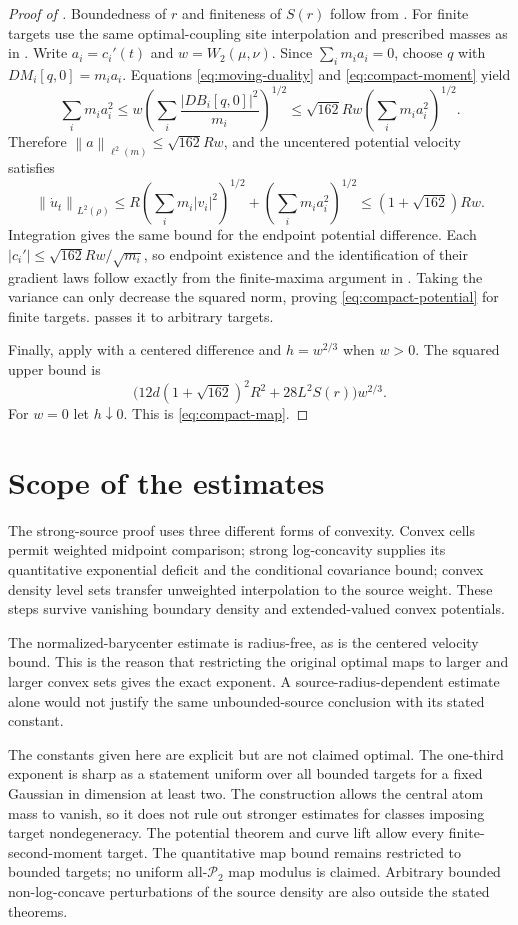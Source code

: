\documentclass[11pt]{article}
\numberwithin{equation}{section}
\theoremstyle{remark}
\newcommand{\Prob}{\mathcal P}
\newcommand{\norm}[1]{\left\lVert #1\right\rVert}
\begin{document}
\begin{proof}[Proof of ]
Boundedness of $r$ and finiteness of $S(r)$ follow from . For finite targets use the same optimal-coupling site interpolation and prescribed masses as in . Write $a_i=c_i'(t)$ and $w=W_2(\mu,\nu)$. Since $\sum_i m_i a_i=0$, choose $q$ with $DM_i[q,0]=m_i a_i$. Equations \eqref{eq:moving-duality} and \eqref{eq:compact-moment} yield
\[
 \sum_i m_i a_i^2
 \le w\left(\sum_i\frac{|DB_i[q,0]|^2}{m_i}\right)^{1/2}
 \le\sqrt{162}Rw\left(\sum_i m_i a_i^2\right)^{1/2}.
\]
Therefore $\norm a_{\ell^2(m)}\le\sqrt{162}Rw$, and the uncentered potential velocity satisfies
\[
 \norm{\dot u_t}_{L^2(\rho)}
 \le R\left(\sum_i m_i|v_i|^2\right)^{1/2}
      +\left(\sum_i m_i a_i^2\right)^{1/2}
 \le(1+\sqrt{162})Rw.
\]
Integration gives the same bound for the endpoint potential difference. Each $|c_i'|\le\sqrt{162}Rw/\sqrt{m_i}$, so endpoint existence and the identification of their gradient laws follow exactly from the finite-maxima argument in . Taking the variance can only decrease the squared norm, proving \eqref{eq:compact-potential} for finite targets.  passes it to arbitrary targets.

Finally, apply  with a centered difference and $h=w^{2/3}$ when $w>0$. The squared upper bound is
\[
 \bigl(12d(1+\sqrt{162})^2R^2+28L^2S(r)\bigr)w^{2/3}.
\]
For $w=0$ let $h\downarrow0$. This is \eqref{eq:compact-map}.
\end{proof}

\section{Scope of the estimates}\label{sec:scope}
The strong-source proof uses three different forms of convexity. Convex cells permit weighted midpoint comparison; strong log-concavity supplies its quantitative exponential deficit and the conditional covariance bound; convex density level sets transfer unweighted interpolation to the source weight. These steps survive vanishing boundary density and extended-valued convex potentials.

The normalized-barycenter estimate is radius-free, as is the centered velocity bound. This is the reason that restricting the original optimal maps to larger and larger convex sets gives the exact exponent. A source-radius-dependent estimate alone would not justify the same unbounded-source conclusion with its stated constant.

The constants given here are explicit but are not claimed optimal. The one-third exponent is sharp as a statement uniform over all bounded targets for a fixed Gaussian in dimension at least two. The construction allows the central atom mass to vanish, so it does not rule out stronger estimates for classes imposing target nondegeneracy. The potential theorem and curve lift allow every finite-second-moment target. The quantitative map bound remains restricted to bounded targets; no uniform all-$\Prob_2$ map modulus is claimed. Arbitrary bounded non-log-concave perturbations of the source density are also outside the stated theorems.



\end{document}
